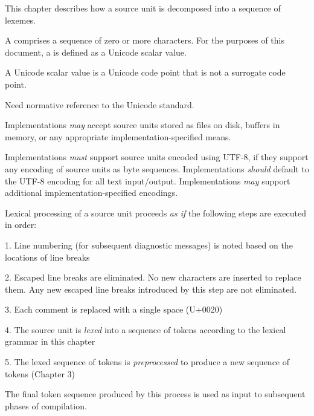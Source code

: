 
This chapter describes how a source unit is decomposed into a sequence of lexemes.


A  comprises a sequence of zero or more characters.
For the purposes of this document, a  is defined as a Unicode scalar value.

\begin{Note}
A Unicode scalar value is a Unicode code point that is not a surrogate code point.
\end{Note}

\begin{Incomplete}
Need normative reference to the Unicode standard.    
\end{Incomplete} 

Implementations \emph{may} accept source units stored as files on disk, buffers in memory, or any appropriate implementation-specified means.


Implementations \emph{must} support source units encoded using UTF-8, if they support any encoding of source units as byte sequences.
Implementations \emph{should} default to the UTF-8 encoding for all text input/output.
Implementations \emph{may} support additional implementation-specified encodings.


Lexical processing of a source unit proceeds \emph{as if} the following steps are executed in order:

1. Line numbering (for subsequent diagnostic messages) is noted based on the locations of line breaks

2. Escaped line breaks are eliminated. No new characters are inserted to replace them. Any new escaped line breaks introduced by this step are not eliminated.

3. Each comment is replaced with a single space (U+0020)

4. The source unit is \emph{lexed} into a sequence of tokens according to the lexical grammar in this chapter

5. The lexed sequence of tokens is \emph{preprocessed} to produce a new sequence of tokens (Chapter 3)

The final token sequence produced by this process is used as input to subsequent phases of compilation.

